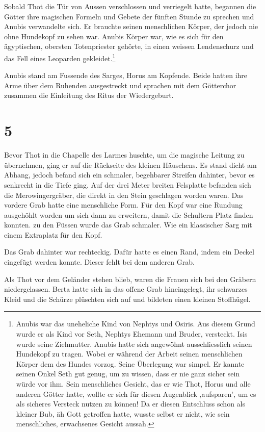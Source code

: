 \documentclass[11pt,titlepage,a5paper]{book}
\begin{document}
Sobald Thot die Tür von Aussen verschlossen und verriegelt hatte, begannen die Götter ihre magischen Formeln und Gebete der fünften Stunde zu sprechen und Anubis verwandelte sich. Er brauchte seinen menschlichen Körper, der jedoch nie ohne Hundekopf zu sehen war. Anubis Körper war, wie es sich für den ägyptischen, obersten Totenpriester gehörte, in einen weissen Lendenschurz und das Fell eines Leoparden gekleidet.\footnote{Anubis war das uneheliche Kind von Nephtys und Osiris. Aus diesem Grund wurde er als Kind vor Seth, Nephtys Ehemann und Bruder, versteckt. Isis wurde seine Ziehmutter. Anubis hatte sich angewöhnt ausschliesslich seinen Hundekopf zu tragen. Wobei er während der Arbeit seinen menschlichen Körper dem des Hundes vorzog. Seine Überlegung war simpel. Er kannte seinen Onkel Seth gut genug, um zu wissen, dass er nie ganz sicher sein würde vor ihm. Sein menschliches Gesicht, das er wie Thot, Horus und alle anderen Götter hatte, wollte er sich für diesen Augenblick ,aufsparen', um es als sicheres Versteck nutzen zu können! Da er diesen Entschluss schon als kleiner Bub, äh Gott getroffen hatte, wusste selbst er nicht, wie sein menschliches, erwachsenes Gesicht aussah.}

Anubis stand am Fussende des Sarges, Horus am Kopfende. Beide hatten ihre Arme über dem Ruhenden ausgestreckt und sprachen mit dem Götterchor zusammen die Einleitung des Ritus der Wiedergeburt.


\section*{5}

Bevor Thot in die Chapelle des Larmes huschte, um die magische Leitung zu übernehmen, ging er auf die Rückseite des kleinen Häuschens. Es stand dicht am Abhang, jedoch befand sich ein schmaler, begehbarer Streifen dahinter, bevor es senkrecht in die Tiefe ging. Auf der drei Meter breiten Felsplatte befanden sich die Merowingergräber, die direkt in den Stein geschlagen worden waren. Das vordere Grab hatte eine menschliche Form. Für den Kopf war eine Rundung ausgehöhlt worden um sich dann zu erweitern, damit die Schultern Platz finden konnten. zu den Füssen wurde das Grab schmaler. Wie ein klassischer Sarg mit einem Extraplatz für den Kopf.

Das Grab dahinter war rechteckig. Dafür hatte es einen Rand, indem ein Deckel eingefügt werden konnte. Dieser fehlt bei dem anderen Grab.

Als Thot vor dem Geländer stehen blieb, waren die Frauen sich bei den Gräbern niedergelassen. Berta hatte sich in das offene Grab hineingelegt, ihr schwarzes Kleid und die Schürze plüschten sich auf und bildeten einen kleinen Stoffhügel.
\end{document}
